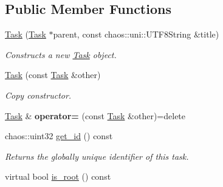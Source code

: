 \subsection*{Public Member Functions}
\begin{DoxyCompactItemize}
\item 
\hyperlink{classsigma_1_1core_1_1tasks_1_1_task_ad0c18c7b0fc306cf4fe6f133766b2779}{Task} (\hyperlink{classsigma_1_1core_1_1tasks_1_1_task}{Task} $\ast$parent, const chaos\-::uni\-::\-U\-T\-F8\-String \&title)
\begin{DoxyCompactList}\small\item\em Constructs a new \hyperlink{classsigma_1_1core_1_1tasks_1_1_task}{Task} object. \end{DoxyCompactList}\item 
\hyperlink{classsigma_1_1core_1_1tasks_1_1_task_a222255707537a07f64c687c87efef1e6}{Task} (const \hyperlink{classsigma_1_1core_1_1tasks_1_1_task}{Task} \&other)
\begin{DoxyCompactList}\small\item\em Copy constructor. \end{DoxyCompactList}\item 
\hypertarget{classsigma_1_1core_1_1tasks_1_1_task_a0deca6972a54102c60c212e0d5827d0b}{\hyperlink{classsigma_1_1core_1_1tasks_1_1_task}{Task} \& {\bfseries operator=} (const \hyperlink{classsigma_1_1core_1_1tasks_1_1_task}{Task} \&other)=delete}\label{classsigma_1_1core_1_1tasks_1_1_task_a0deca6972a54102c60c212e0d5827d0b}

\item 
chaos\-::uint32 \hyperlink{classsigma_1_1core_1_1tasks_1_1_task_ae701da71b09d846ef31c5781937a79c8}{get\-\_\-id} () const 
\begin{DoxyCompactList}\small\item\em Returns the globally unique identifier of this task. \end{DoxyCompactList}\item 
\hypertarget{classsigma_1_1core_1_1tasks_1_1_task_a615ceebc720367c0b26652163118bcb9}{virtual bool \hyperlink{classsigma_1_1core_1_1tasks_1_1_task_a615ceebc720367c0b26652163118bcb9}{is\-\_\-root} () const }\label{classsigma_1_1core_1_1tasks_1_1_task_a615ceebc720367c0b26652163118bcb9}


\end{DoxyCompactItemize}
